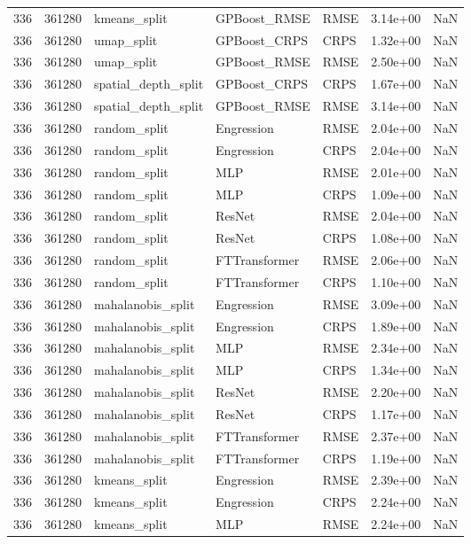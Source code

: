 \begin{tabular}{rrlllrr}
336 & 361280 & kmeans\_split & GPBoost\_RMSE & RMSE & 3.14e+00 & NaN \\
336 & 361280 & umap\_split & GPBoost\_CRPS & CRPS & 1.32e+00 & NaN \\
336 & 361280 & umap\_split & GPBoost\_RMSE & RMSE & 2.50e+00 & NaN \\
336 & 361280 & spatial\_depth\_split & GPBoost\_CRPS & CRPS & 1.67e+00 & NaN \\
336 & 361280 & spatial\_depth\_split & GPBoost\_RMSE & RMSE & 3.14e+00 & NaN \\
336 & 361280 & random\_split & Engression & RMSE & 2.04e+00 & NaN \\
336 & 361280 & random\_split & Engression & CRPS & 2.04e+00 & NaN \\
336 & 361280 & random\_split & MLP & RMSE & 2.01e+00 & NaN \\
336 & 361280 & random\_split & MLP & CRPS & 1.09e+00 & NaN \\
336 & 361280 & random\_split & ResNet & RMSE & 2.04e+00 & NaN \\
336 & 361280 & random\_split & ResNet & CRPS & 1.08e+00 & NaN \\
336 & 361280 & random\_split & FTTransformer & RMSE & 2.06e+00 & NaN \\
336 & 361280 & random\_split & FTTransformer & CRPS & 1.10e+00 & NaN \\
336 & 361280 & mahalanobis\_split & Engression & RMSE & 3.09e+00 & NaN \\
336 & 361280 & mahalanobis\_split & Engression & CRPS & 1.89e+00 & NaN \\
336 & 361280 & mahalanobis\_split & MLP & RMSE & 2.34e+00 & NaN \\
336 & 361280 & mahalanobis\_split & MLP & CRPS & 1.34e+00 & NaN \\
336 & 361280 & mahalanobis\_split & ResNet & RMSE & 2.20e+00 & NaN \\
336 & 361280 & mahalanobis\_split & ResNet & CRPS & 1.17e+00 & NaN \\
336 & 361280 & mahalanobis\_split & FTTransformer & RMSE & 2.37e+00 & NaN \\
336 & 361280 & mahalanobis\_split & FTTransformer & CRPS & 1.19e+00 & NaN \\
336 & 361280 & kmeans\_split & Engression & RMSE & 2.39e+00 & NaN \\
336 & 361280 & kmeans\_split & Engression & CRPS & 2.24e+00 & NaN \\
336 & 361280 & kmeans\_split & MLP & RMSE & 2.24e+00 & NaN \\

\end{tabular}
